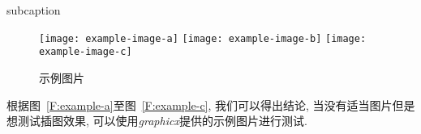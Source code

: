 \documentclass[AutoFakeBold,AutoFakeSlant]{ctexart}
\begin{document}
\begin{latexbox}{subcaption}
\begin{figure}[H]
    \centering
        {\texttt{[image: example-image-a]}}
        {\texttt{[image: example-image-b]}}
        {\texttt{[image: example-image-c]}}
    \caption{示例图片}\label{F:example}
\end{figure}
根据图~\ref{F:example-a}至图~\ref{F:example-c}, 我们可以得出结论, 当没有适当图片但是想测试插图效果, 可以使用\emph{graphicx}提供的示例图片进行测试.
\end{latexbox}
\end{document}
